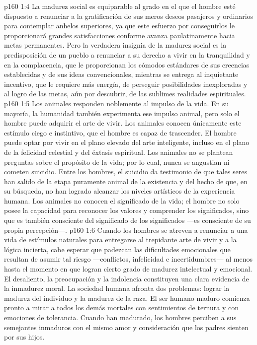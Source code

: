 \vs p160 1:4 La madurez social es equiparable al grado en el que el hombre esté dispuesto a renunciar a la gratificación de sus meros deseos pasajeros y ordinarios para contemplar anhelos superiores, ya que este esfuerzo por conseguirlos le proporcionará grandes satisfacciones conforme avanza paulatinamente hacia metas permanentes. Pero la verdadera insignia de la madurez social es la predisposición de un pueblo a renunciar a su derecho a vivir en la tranquilidad y en la complacencia, que le proporcionan los cómodos estándares de sus creencias establecidas y de sus ideas convencionales, mientras se entrega al inquietante incentivo, que le requiere más energía, de perseguir posibilidades inexploradas y al logro de las metas, aún por descubrir, de las sublimes realidades espirituales.
\vs p160 1:5 Los animales responden noblemente al impulso de la vida. En su mayoría, la humanidad también experimenta ese impulso animal, pero solo el hombre puede adquirir el arte de vivir. Los animales conocen únicamente este estímulo ciego e instintivo, que el hombre es capaz de trascender. El hombre puede optar por vivir en el plano elevado del arte inteligente, incluso en el plano de la felicidad celestial y del éxtasis espiritual. Los animales no se plantean preguntas sobre el propósito de la vida; por lo cual, nunca se angustian ni cometen suicidio. Entre los hombres, el suicidio da testimonio de que tales seres han salido de la etapa puramente animal de la existencia y del hecho de que, en su búsqueda, no han logrado alcanzar los niveles artísticos de la experiencia humana. Los animales no conocen el significado de la vida; el hombre no solo posee la capacidad para reconocer los valores y comprender los significados, sino que es también consciente del significado de los significados ---es consciente de su propia percepción---.
\vs p160 1:6 Cuando los hombres se atreven a renunciar a una vida de estímulos naturales para entregarse al trepidante arte de vivir y a la lógica incierta, cabe esperar que padezcan las dificultades emocionales que resultan de asumir tal riesgo ---conflictos, infelicidad e incertidumbres--- al menos hasta el momento en que logran cierto grado de madurez intelectual y emocional. El desaliento, la preocupación y la indolencia constituyen una clara evidencia de la inmadurez moral. La sociedad humana afronta dos problemas: lograr la madurez del individuo y la madurez de la raza. El ser humano maduro comienza pronto a mirar a todos los demás mortales con sentimientos de ternura y con emociones de tolerancia. Cuando han madurado, los hombres perciben a sus semejantes inmaduros con el mismo amor y consideración que los padres sienten por sus hijos.
